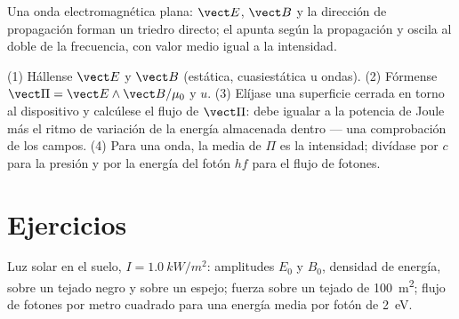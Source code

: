 \begin{omfigure}

{\small Una onda electromagnética plana: $\vect E$, $\vect B$ y la dirección
de propagación forman un triedro directo; el  apunta
según la propagación y oscila al doble de la frecuencia, con valor medio
igual a la intensidad.}
\end{omfigure}

\begin{method}\label{met:b2:poynting-vector:method}
(1) Hállense $\vect E$ y $\vect B$ (estática, cuasiestática u ondas). (2)
Fórmense $\vect\Pi = \vect E\wedge\vect B/\mu_0$ y $u$. (3) Elíjase una
superficie cerrada en torno al dispositivo y calcúlese el flujo de
$\vect\Pi$: debe igualar a la potencia de Joule más el ritmo de variación
de la energía almacenada dentro --- una comprobación de los campos. (4)
Para una onda, la media de $\Pi$ es la intensidad; divídase por $c$ para
la presión y por la energía del fotón $hf$ para el flujo de fotones.
\end{method}

\section{Ejercicios}

\begin{exercise}[$\star$]\label{exo:b2:poynting-vector:1}
Luz solar en el suelo, $I = \qty{1.0}{kW/m^2}$: amplitudes $E_0$ y $B_0$,
densidad de energía,  sobre un tejado negro y sobre un
espejo; fuerza sobre un tejado de \qty{100}{m^2}; flujo de fotones por
metro cuadrado para una energía media por fotón de \qty{2}{eV}.
\end{exercise}

